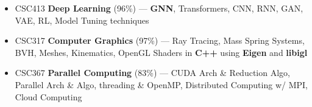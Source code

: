 \documentclass[10pt,a4paper,ragged2e,withhyper]{altacv}
\begin{document}
\begin{paracol}{2}
\begin{itemize}




    \end{itemize}

    \vspace{-3pt}

    \begin{itemize}
        \item CSC413 \textbf{Deep Learning} (96\%) --- \textbf{GNN}, Transformers, CNN, RNN, GAN, VAE,  RL, Model Tuning techniques

        \item CSC317 \textbf{Computer Graphics} (97\%) --- Ray Tracing, Mass
              Spring Systems, BVH, Meshes, Kinematics, OpenGL Shaders in
              \textbf{C++} using \textbf{Eigen} and \textbf{libigl}

        \item  CSC367 \textbf{Parallel Computing} (83\%) ---
              CUDA Arch \& Reduction Algo, Parallel Arch \& Algo, threading \&
              OpenMP, Distributed Computing w/ MPI, Cloud Computing



\end{itemize}
\end{paracol}
\end{document}
